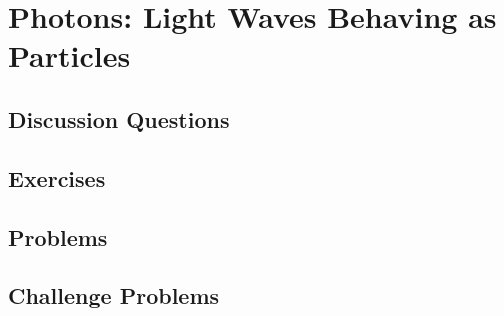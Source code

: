 
\chapter{Photons: Light Waves Behaving as Particles}

\section{Discussion Questions}

\section{Exercises}

\section{Problems}

\section{Challenge Problems}
